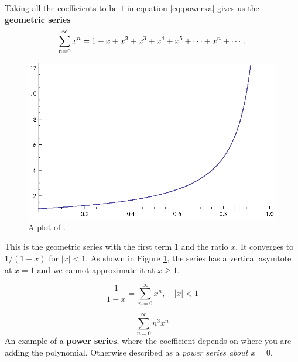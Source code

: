     Taking all the coefficients to be $1$ in equation \eqref{eq:powerxa}
    gives us the \textbf{geometric series}
    \begin{equation}\label{eq:geopower}
      \sum_{n=0}^{\infty} x^n = 1 + x + x^2 + x^3 + x^4 + x^5 + \cdots + x^n  + \cdots.
    \end{equation}
    \cite[p. 575]{thomas}
    \begin{figure}[H]
      \begin{center}
        \includegraphics{continuous/series/geopower}
      \end{center}
      \caption{A plot of .\label{fig:geopower}}
    \end{figure}
    This is the geometric series with the first term $1$ and the ratio $x$.
    It converges to $1/(1-x)$ for $|x|<1.$ As shown in Figure
    \ref{fig:geopower}, the series has a vertical asymtote at $x=1$ and we
    cannot approximate it at $x \geq 1$.
    \begin{theorem}
      \label{th:recipowser}
      \begin{equation}
        \frac{1}{1-x} = \sum_{n=0}^{\infty}x^n, \quad |x| < 1
      \end{equation}
    \end{theorem}
\begin{ex}
  \[ \sum^\infty_{n=0} n^3 x^n   \]
  An example of a \textbf{power series}, where the coefficient depends on where
  you are adding the polynomial.\label{powerseriesex1}
  Otherwise described as a \emph{power series about \(x=0\)}.
\end{ex}
